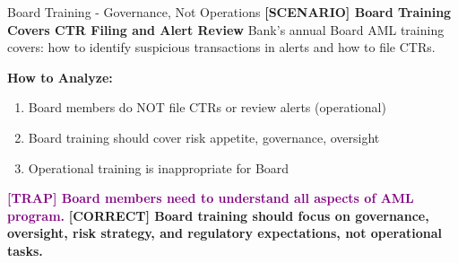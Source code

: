 \documentclass[11pt,a4paper]{beamer}
\newcommand{\trap}[1]{\textcolor{purple}{\textbf{[TRAP] #1}}}
\newcommand{\correct}[1]{\textcolor{green!50!black}{\textbf{[CORRECT] #1}}}
\newcommand{\scenario}[1]{\textcolor{blue!70!black}{\textbf{[SCENARIO] #1}}}
\begin{document}
	\begin{frame}{Board Training - Governance, Not Operations}
		\scenario{Board Training Covers CTR Filing and Alert Review}
		Bank's annual Board AML training covers: how to identify suspicious transactions in alerts and how to file CTRs.
		
		\vspace{0.1cm}
		\textbf{How to Analyze:}
		\begin{enumerate}
			\item Board members do NOT file CTRs or review alerts (operational)
			\item Board training should cover risk appetite, governance, oversight
			\item Operational training is inappropriate for Board
		\end{enumerate}
		\trap{Board members need to understand all aspects of AML program.}
		\correct{Board training should focus on governance, oversight, risk strategy, and regulatory expectations, not operational tasks.}
	\end{frame}
	
\end{document}
